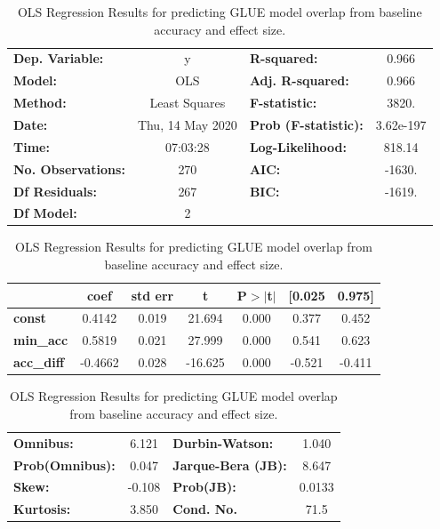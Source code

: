 \documentclass[11pt,a4paper]{article}
\begin{document}
\begin{table}
\begin{center}
\begin{tabular}{lclc}
\toprule
\textbf{Dep. Variable:}    &        y         & \textbf{  R-squared:         } &     0.966   \\
\textbf{Model:}            &       OLS        & \textbf{  Adj. R-squared:    } &     0.966   \\
\textbf{Method:}           &  Least Squares   & \textbf{  F-statistic:       } &     3820.   \\
\textbf{Date:}             & Thu, 14 May 2020 & \textbf{  Prob (F-statistic):} & 3.62e-197   \\
\textbf{Time:}             &     07:03:28     & \textbf{  Log-Likelihood:    } &    818.14   \\
\textbf{No. Observations:} &         270      & \textbf{  AIC:               } &    -1630.   \\
\textbf{Df Residuals:}     &         267      & \textbf{  BIC:               } &    -1619.   \\
\textbf{Df Model:}         &           2      & \textbf{                     } &             \\
\bottomrule
\end{tabular}
\begin{tabular}{lcccccc}
               & \textbf{coef} & \textbf{std err} & \textbf{t} & \textbf{P$> |$t$|$} & \textbf{[0.025} & \textbf{0.975]}  \\
\midrule
\textbf{const} &       0.4142  &        0.019     &    21.694  &         0.000        &        0.377    &        0.452     \\
\textbf{min\_acc}    &       0.5819  &        0.021     &    27.999  &         0.000        &        0.541    &        0.623     \\
\textbf{acc\_diff}    &      -0.4662  &        0.028     &   -16.625  &         0.000        &       -0.521    &       -0.411     \\
\bottomrule
\end{tabular}
\begin{tabular}{lclc}
\textbf{Omnibus:}       &  6.121 & \textbf{  Durbin-Watson:     } &    1.040  \\
\textbf{Prob(Omnibus):} &  0.047 & \textbf{  Jarque-Bera (JB):  } &    8.647  \\
\textbf{Skew:}          & -0.108 & \textbf{  Prob(JB):          } &   0.0133  \\
\textbf{Kurtosis:}      &  3.850 & \textbf{  Cond. No.          } &     71.5  \\
\bottomrule
\end{tabular}
\caption{OLS Regression Results for predicting GLUE model overlap from baseline accuracy and effect size.}
\label{tab:app_ols_glue}
\end{center}
\end{table}
\end{document}
